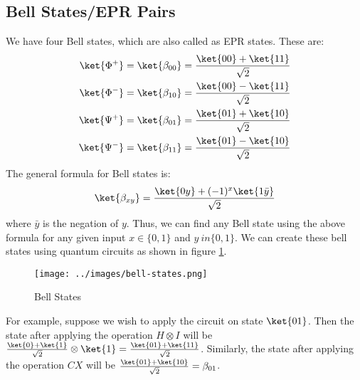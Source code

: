 \documentclass[12pt, oneside]{book}
\theoremstyle{definition}
\theoremstyle{definition}
\theoremstyle{remark}
\begin{document}
\subsection{Bell States/EPR Pairs}
We have four Bell states, which are also called as EPR states. These are:
\begin{align*}
    \ket{\Phi^+}&=\ket{\beta_{00}}=\frac{\ket{00}+\ket{11}}{\sqrt{2}} \\
    \ket{\Phi^-}&=\ket{\beta_{10}}=\frac{\ket{00}-\ket{11}}{\sqrt{2}} \\
    \ket{\Psi^+}&=\ket{\beta_{01}}=\frac{\ket{01}+\ket{10}}{\sqrt{2}} \\
    \ket{\Psi^-}&=\ket{\beta_{11}}=\frac{\ket{01}-\ket{10}}{\sqrt{2}} \\
\end{align*}
The general formula for Bell states is:
\[
    \ket{\beta_{xy}}=\frac{\ket{0y}+(-1)^x\ket{1\bar{y}}}{\sqrt{2}}
\]
where $\bar{y}$ is the negation of $y$. Thus, we can find any Bell state using the above formula for 
any given input $x \in \{0,1\}$ and $y\ in \{0,1\}$.
We can create these bell states using quantum circuits as shown in figure \ref{fig:bell-states}.
\begin{figure}[H]
    \centering
    \texttt{[image: ../images/bell-states.png]}
    \caption{Bell States}
    \label{fig:bell-states}
\end{figure}
For example, suppose we wish to apply the circuit on state $\ket{01}$. Then the state after applying the
operation $H \otimes I$ will be $\frac{\ket{0}+\ket{1}}{\sqrt{2}}\otimes\ket{1}=\frac{\ket{01}+\ket{11}}{\sqrt{2}}$.
Similarly, the state after applying the operation $CX$ will be $\frac{\ket{01}+\ket{10}}{\sqrt{2}}=\beta_{01}$.
\end{document}

